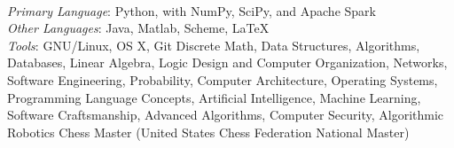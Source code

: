\documentclass[11pt]{article}
\begin{document}
\begin{adjustwidth}{-2.2cm}{-2.2cm}
    ~\\[0.01\baselineskip]
    \emph{Primary Language}: Python, with NumPy, SciPy, and Apache Spark\\
    \emph{Other Languages}: Java, Matlab, Scheme, \LaTeX\\
    \emph{Tools}: GNU/Linux, OS X, Git
    \eosec
    Discrete Math, Data Structures, Algorithms, Databases, Linear Algebra, Logic Design and Computer Organization, Networks, Software Engineering, Probability, Computer Architecture, Operating Systems, Programming Language Concepts, Artificial Intelligence, Machine Learning, Software Craftsmanship, Advanced Algorithms, Computer Security, Algorithmic Robotics
    \eosec
    Chess Master (United States Chess Federation National Master)
\end{adjustwidth}
\end{document}
